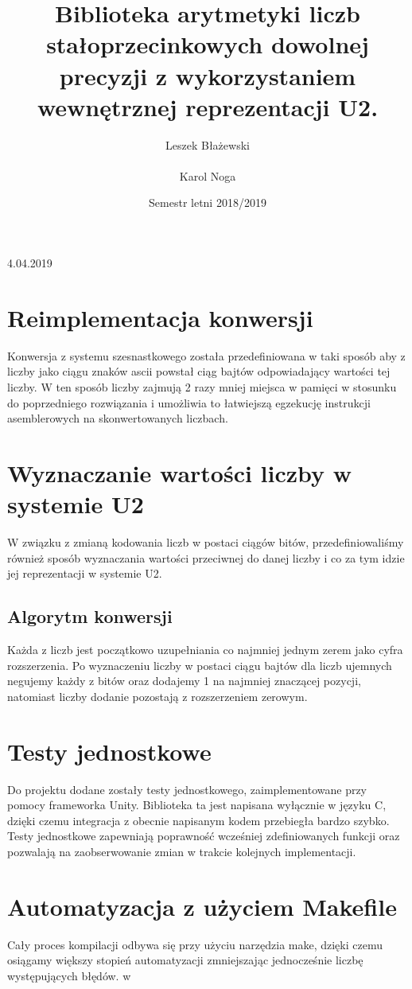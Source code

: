 \documentclass{article}
\title{Biblioteka arytmetyki liczb stałoprzecinkowych dowolnej precyzji z wykorzystaniem wewnętrznej reprezentacji U2.}
\author{Leszek Błażewski \\ \\Karol Noga}
\date{Semestr letni 2018/2019}
\begin{document}
\maketitle
\vspace{1mm}
{\centering \Large{4.04.2019}\par}
\clearpage
\section{Reimplementacja konwersji}
Konwersja z systemu szesnastkowego została przedefiniowana w taki sposób aby 
z liczby jako ciągu znaków ascii powstał ciąg bajtów odpowiadający wartości tej liczby. W ten sposób liczby zajmują 2 razy mniej miejsca w pamięci w stosunku do poprzedniego rozwiązania i umożliwia to łatwiejszą egzekucję instrukcji asemblerowych na skonwertowanych liczbach.

\section{Wyznaczanie wartości liczby w systemie U2}
W związku z zmianą kodowania liczb w postaci ciągów bitów, przedefiniowaliśmy również sposób wyznaczania wartości przeciwnej do danej liczby i co za tym idzie jej reprezentacji w systemie U2.

\subsection{Algorytm konwersji}
Każda z liczb jest początkowo uzupełniania co najmniej jednym zerem jako cyfra rozszerzenia. Po wyznaczeniu liczby w postaci ciągu bajtów dla liczb ujemnych negujemy każdy z bitów oraz dodajemy 1 na najmniej znaczącej pozycji, natomiast liczby dodanie pozostają z rozszerzeniem zerowym.

\section{Testy jednostkowe}
Do projektu dodane zostały testy jednostkowego, zaimplementowane przy pomocy frameworka Unity. Biblioteka ta jest napisana wyłącznie w języku C, dzięki czemu integracja z obecnie napisanym kodem przebiegła bardzo szybko. Testy jednostkowe zapewniają poprawność wcześniej zdefiniowanych funkcji oraz pozwalają na zaobserwowanie zmian w trakcie kolejnych implementacji.

\section{Automatyzacja z użyciem Makefile}
Cały proces kompilacji odbywa się przy użyciu narzędzia make, dzięki czemu osiągamy większy stopień automatyzacji zmniejszając jednocześnie liczbę występujących błędów.
w
\end{document}
